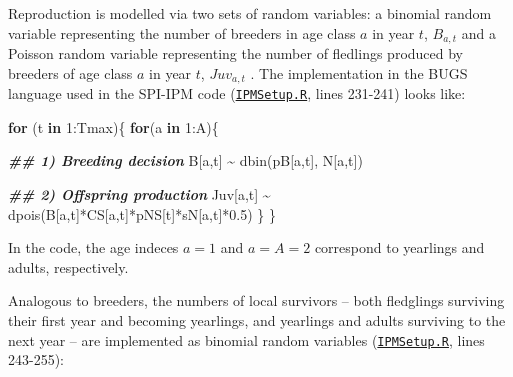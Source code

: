 \documentclass[
]{book}
\newenvironment{Shaded}{\begin{snugshade}}{\end{snugshade}}
\newcommand{\ControlFlowTok}[1]{\textcolor[rgb]{0.13,0.29,0.53}{\textbf{#1}}}
\newcommand{\DecValTok}[1]{\textcolor[rgb]{0.00,0.00,0.81}{#1}}
\newcommand{\DocumentationTok}[1]{\textcolor[rgb]{0.56,0.35,0.01}{\textbf{\textit{#1}}}}
\newcommand{\FloatTok}[1]{\textcolor[rgb]{0.00,0.00,0.81}{#1}}
\newcommand{\FunctionTok}[1]{\textcolor[rgb]{0.00,0.00,0.00}{#1}}
\newcommand{\NormalTok}[1]{#1}
\newcommand{\SpecialCharTok}[1]{\textcolor[rgb]{0.00,0.00,0.00}{#1}}
\begin{document}
Reproduction is modelled via two sets of random variables: a binomial random
variable representing the number of breeders in age class \(a\) in year \(t\),
\(B_{a,t}\) and a Poisson random variable representing the
number of fledlings produced by breeders of age class \(a\) in year \(t\),
\(Juv_{a,t}\) . The implementation in the BUGS language used in the
SPI-IPM code (\href{https://github.com/SPI-Birds/SPI-IPM/blob/main/SPI-IPM_Code/02-04_IPM_Setup\&Run/IPMSetup.R}{\texttt{IPMSetup.R}}, lines 231-241) looks like:

\begin{Shaded}
\begin{Highlighting}[]
\ControlFlowTok{for}\NormalTok{ (t }\ControlFlowTok{in} \DecValTok{1}\SpecialCharTok{:}\NormalTok{Tmax)\{}
  \ControlFlowTok{for}\NormalTok{(a }\ControlFlowTok{in} \DecValTok{1}\SpecialCharTok{:}\NormalTok{A)\{}
    
    \DocumentationTok{\#\# 1) Breeding decision}
\NormalTok{    B[a,t] }\SpecialCharTok{\textasciitilde{}} \FunctionTok{dbin}\NormalTok{(pB[a,t], N[a,t])}
    
    \DocumentationTok{\#\# 2) Offspring production}
\NormalTok{    Juv[a,t] }\SpecialCharTok{\textasciitilde{}} \FunctionTok{dpois}\NormalTok{(B[a,t]}\SpecialCharTok{*}\NormalTok{CS[a,t]}\SpecialCharTok{*}\NormalTok{pNS[t]}\SpecialCharTok{*}\NormalTok{sN[a,t]}\SpecialCharTok{*}\FloatTok{0.5}\NormalTok{)}
\NormalTok{  \}}
\NormalTok{\}}
\end{Highlighting}
\end{Shaded}

In the code, the age indeces \(a=1\) and \(a=A=2\) correspond to yearlings and
adults, respectively.

Analogous to breeders, the numbers of local survivors -- both fledglings surviving their
first year and becoming yearlings, and yearlings and adults surviving to the
next year -- are implemented as binomial random variables (\href{https://github.com/SPI-Birds/SPI-IPM/blob/main/SPI-IPM_Code/02-04_IPM_Setup\&Run/IPMSetup.R}{\texttt{IPMSetup.R}}, lines 243-255):
\end{document}
